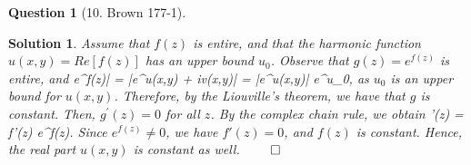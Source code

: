 \documentclass{article} %
\def\eQb#1\eQe{\begin{eqnarray*}#1\end{eqnarray*}}
\theoremstyle{quest}
\newtheorem*{question}{Question}
\newtheorem*{solution}{Solution}
\begin{document}
\bigskip

\begin{question}[10. Brown 177-1]
\end{question}
\begin{solution}
Assume that $f(z)$ is entire, and that the harmonic function $u(x,y) = Re[f(z)]$
has an upper bound $u_0$. Observe that $g(z) = e^{f(z)}$ is entire, and 
\eQb
|e^{f(z)}| = |e^{u(x,y) + iv(x,y)}| = |e^{u(x,y)}| \leq e^{u_0},
\eQe
as $u_0$ is an upper bound for $u(x,y)$. Therefore, by the Liouville's theorem, we have
that $g$ is constant. Then, $g^{'}(z) = 0$ for all $z$. By the complex chain rule, we obtain
\eQb
g'(z) = f'(z) e^{f(z)}. 
\eQe
Since $e^{f(z)} \neq 0$, we have $f'(z) = 0$, and $f(z)$ is constant. 
Hence, the real part $u(x,y)$ is constant as well. $\qed$

\end{solution}
\end{document}
